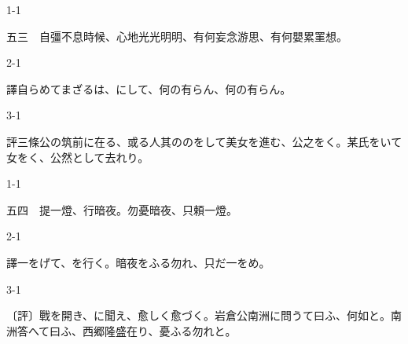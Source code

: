 \documentclass[tate,paper=b6j,jafontsize=9pt]{jlreq}
\begin{document}
\begin{azconvIndented}{1\zw}{-1\zw}

五三　自彊不息時候、心地光光明明、有何妄念游思、有何嬰累罣想。

\end{azconvIndented}
\begin{azconvIndented}{2\zw}{-1\zw}

譯自らめてまざるは、にして、何の有らん、何の有らん。

\end{azconvIndented}
\begin{azconvIndented}{3\zw}{-1\zw}

評三條公の筑前に在る、或る人其ののをして美女を進む、公之をく。某氏をいて女をく、公然として去れり。

\end{azconvIndented}

\begin{azconvIndented}{1\zw}{-1\zw}

五四　提一燈、行暗夜。勿憂暗夜、只頼一燈。

\end{azconvIndented}
\begin{azconvIndented}{2\zw}{-1\zw}

譯一をげて、を行く。暗夜をふる勿れ、只だ一をめ。

\end{azconvIndented}
\begin{azconvIndented}{3\zw}{-1\zw}

〔評〕戰を開き、に聞え、愈しく愈づく。岩倉公南洲に問うて曰ふ、何如と。南洲答へて曰ふ、西郷隆盛在り、憂ふる勿れと。

\end{azconvIndented}
\end{document}
